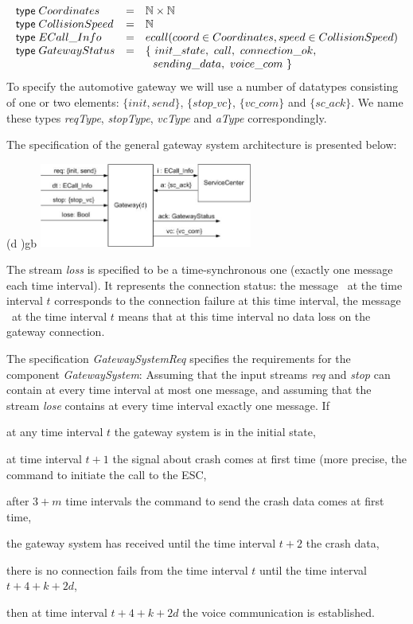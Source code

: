 %
\[
\begin{array}{lcl}
  \textsf{type\;} Coordinates &=& {\mathbb N} \times {\mathbb N}
  \\
  \textsf{type\;} CollisionSpeed &=& {\mathbb N}
  \\
  \textsf{type\;} ECall\_Info &=& ecall(coord \in Coordinates, speed \in CollisionSpeed)
  \\
  \textsf{type\;} GatewayStatus &=& 
  \{~ init\_state,~ call,~ connection\_ok,\\
  && ~ ~sending\_data,~ voice\_com ~\}
\end{array}
\]
To specify the automotive gateway we will use a number of datatypes 
consisting of one or two elements: 
$\{init, send\}$, $\{stop\_vc\}$, $\{vc\_com\}$ and $\{sc\_ack\}$. 
We name these types \emph{reqType}, \emph{stopType}, \emph{vcType} and \emph{aType} correspondingly.

The \Focus specification of the general gateway system architecture is presented below:

\begin{spec}{(\nconst d \in \Nat)}{gb}
\centering \includegraphics[width=7cm]{fig/gatewaySystem.jpg}
\end{spec} 

\noindent
The stream \emph{loss} is specified to be a time-synchronous one (exactly one message each time interval). 
It represents the connection status: 
the message \ntrue~at the time interval $t$ corresponds to the connection 
failure at this time interval, the message \nfalse~at the time interval $t$ means that 
at this time interval no data loss on the gateway connection.

The specification \emph{GatewaySystemReq} specifies the requirements for the component \emph{GatewaySystem}:
Assuming that the input streams \emph{req} and \emph{stop} can contain at every time interval at most one message, and assuming that the stream \emph{lose} contains at every time interval exactly one message. 
If 
\begin{itemize*}
  \item 
  at any time interval $t$ the gateway system is in the initial state, 
  \item
  at time interval $t+1$ the signal about crash comes at first time 
  (more precise, the command to initiate the call to the ESC,
  \item 
  after $3+m$ time intervals the command to send the crash data comes at first time,
  \item 
  the gateway system has received until the time interval $t+2$ the crash data,  
  \item 
  there is no connection fails from the time interval $t$ until the time interval $t + 4 + k + 2d$,
  \end{itemize*}
%
then at time interval $t + 4 + k + 2d$ the voice communication is established.



